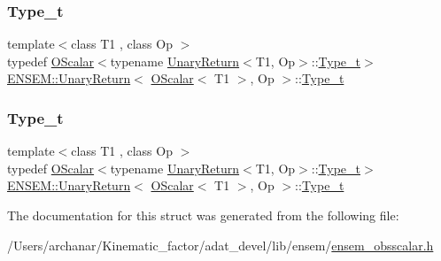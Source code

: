 \subsubsection{\texorpdfstring{Type\_t}{Type\_t}\hspace{0.1cm}{\footnotesize\ttfamily [1/2]}}
{\footnotesize\ttfamily template$<$class T1 , class Op $>$ \\
typedef \mbox{\hyperlink{classENSEM_1_1OScalar}{O\+Scalar}}$<$typename \mbox{\hyperlink{structENSEM_1_1UnaryReturn}{Unary\+Return}}$<$T1, Op$>$\+::\mbox{\hyperlink{structENSEM_1_1UnaryReturn_3_01OScalar_3_01T1_01_4_00_01Op_01_4_a726cb7ab3c097ee6c39cffe7663a39b1}{Type\+\_\+t}}$>$ \mbox{\hyperlink{structENSEM_1_1UnaryReturn}{E\+N\+S\+E\+M\+::\+Unary\+Return}}$<$ \mbox{\hyperlink{classENSEM_1_1OScalar}{O\+Scalar}}$<$ T1 $>$, Op $>$\+::\mbox{\hyperlink{structENSEM_1_1UnaryReturn_3_01OScalar_3_01T1_01_4_00_01Op_01_4_a726cb7ab3c097ee6c39cffe7663a39b1}{Type\+\_\+t}}}

\mbox{\label{structENSEM_1_1UnaryReturn_3_01OScalar_3_01T1_01_4_00_01Op_01_4_a726cb7ab3c097ee6c39cffe7663a39b1}} 
\subsubsection{\texorpdfstring{Type\_t}{Type\_t}\hspace{0.1cm}{\footnotesize\ttfamily [2/2]}}
{\footnotesize\ttfamily template$<$class T1 , class Op $>$ \\
typedef \mbox{\hyperlink{classENSEM_1_1OScalar}{O\+Scalar}}$<$typename \mbox{\hyperlink{structENSEM_1_1UnaryReturn}{Unary\+Return}}$<$T1, Op$>$\+::\mbox{\hyperlink{structENSEM_1_1UnaryReturn_3_01OScalar_3_01T1_01_4_00_01Op_01_4_a726cb7ab3c097ee6c39cffe7663a39b1}{Type\+\_\+t}}$>$ \mbox{\hyperlink{structENSEM_1_1UnaryReturn}{E\+N\+S\+E\+M\+::\+Unary\+Return}}$<$ \mbox{\hyperlink{classENSEM_1_1OScalar}{O\+Scalar}}$<$ T1 $>$, Op $>$\+::\mbox{\hyperlink{structENSEM_1_1UnaryReturn_3_01OScalar_3_01T1_01_4_00_01Op_01_4_a726cb7ab3c097ee6c39cffe7663a39b1}{Type\+\_\+t}}}



The documentation for this struct was generated from the following file\+:\begin{DoxyCompactItemize}
\item 
/\+Users/archanar/\+Kinematic\+\_\+factor/adat\+\_\+devel/lib/ensem/\mbox{\hyperlink{lib_2ensem_2ensem__obsscalar_8h}{ensem\+\_\+obsscalar.\+h}}\end{DoxyCompactItemize}
